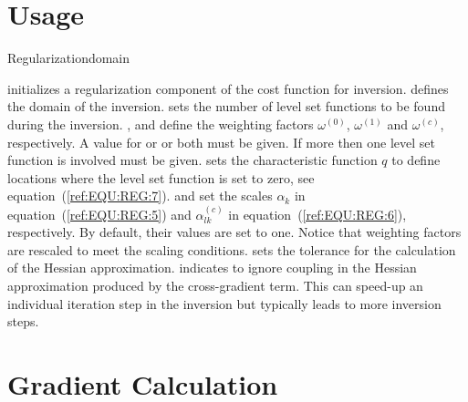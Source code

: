 \section{Usage}


\begin{classdesc}{Regularization}{domain
        }

  
initializes a regularization component of the cost function for inversion. 
 defines the domain of the inversion. 
sets the number of level set functions to be found during the inversion. 
,  and   define the weighting factors
$\omega^{(0)}$,
$\omega^{(1)}$ and
$\omega^{(c)}$, respectively. A value for  or  or both must be given. 
If more then one level set function is involved   must be given. 
 sets the characteristic function $q$ 
to define locations where the level set function is set to zero, see equation~(\ref{ref:EQU:REG:7}).
 and 
 set the scales $\alpha_k$ in equation~(\ref{ref:EQU:REG:5}) and
$\alpha^{(c)}_{lk}$ in equation~(\ref{ref:EQU:REG:6}), respectively. By default, their values are set to one.
Notice that weighting factors are rescaled to meet the scaling conditions.  sets the 
tolerance for the calculation of the Hessian approximation.  
indicates to ignore coupling in the Hessian approximation produced by the 
cross-gradient term. This can speed-up an individual iteration step in the inversion but typically leads to more
inversion steps.
\end{classdesc}

\section{Gradient Calculation}


